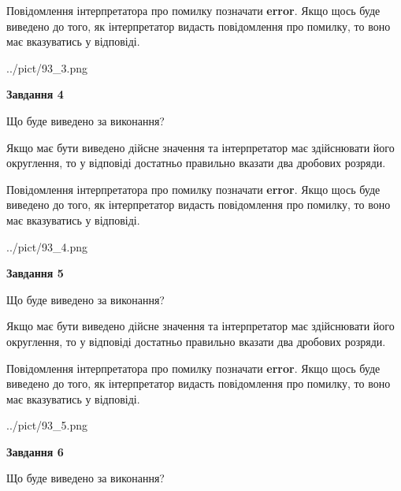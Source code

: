 \documentclass[12pt, ukrainian]{article}
\begin{document}
{\begin {Large}
Повідомлення інтерпретатора про помилку позначати \textbf{error}.
Якщо щось буде виведено до того, як інтерпретатор видасть повідомлення про помилку, 
то воно має вказуватись у відповіді. \par

\begin{center}
	{../pict/93_3.png}
\end{center}
\newpage

{\begin {center}\textbf{Завдання 4}\end {center}}\par
Що буде виведено за виконання? \par

Якщо має бути виведено дійсне значення та інтерпретатор має здійснювати його округлення, 
то у відповіді достатньо правильно вказати два дробових розряди.

Повідомлення інтерпретатора про помилку позначати \textbf{error}.
Якщо щось буде виведено до того, як інтерпретатор видасть повідомлення про помилку, 
то воно має вказуватись у відповіді. \par

\begin{center}
	{../pict/93_4.png}
\end{center}
\newpage

{\begin {center}\textbf{Завдання 5}\end {center}}\par
Що буде виведено за виконання? \par

Якщо має бути виведено дійсне значення та інтерпретатор має здійснювати його округлення, 
то у відповіді достатньо правильно вказати два дробових розряди.

Повідомлення інтерпретатора про помилку позначати \textbf{error}.
Якщо щось буде виведено до того, як інтерпретатор видасть повідомлення про помилку, 
то воно має вказуватись у відповіді. \par

\begin{center}
	{../pict/93_5.png}
\end{center}
\newpage

{\begin {center}\textbf{Завдання 6}\end {center}}\par
Що буде виведено за виконання? \par


\end{Large}}
\end{document}

